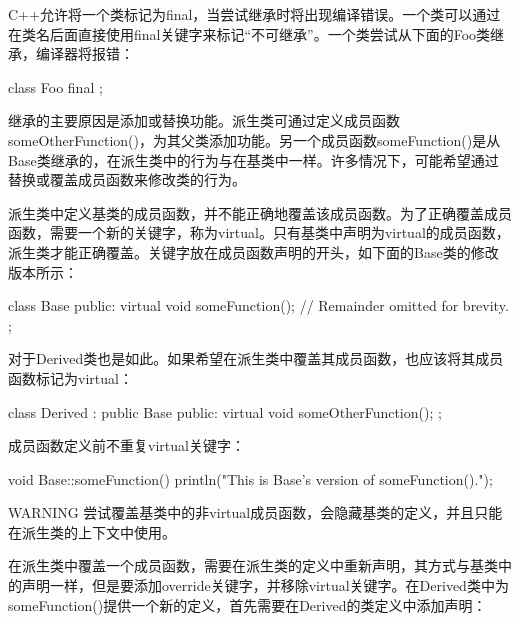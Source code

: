 
C++允许将一个类标记为final，当尝试继承时将出现编译错误。一个类可以通过在类名后面直接使用final关键字来标记“不可继承”。一个类尝试从下面的Foo类继承，编译器将报错：

\begin{cpp}
class Foo final { };
\end{cpp}


继承的主要原因是添加或替换功能。派生类可通过定义成员函数someOtherFunction()，为其父类添加功能。另一个成员函数someFunction()是从Base类继承的，在派生类中的行为与在基类中一样。许多情况下，可能希望通过替换或覆盖成员函数来修改类的行为。


派生类中定义基类的成员函数，并不能正确地覆盖该成员函数。为了正确覆盖成员函数，需要一个新的关键字，称为virtual。只有基类中声明为virtual的成员函数，派生类才能正确覆盖。关键字放在成员函数声明的开头，如下面的Base类的修改版本所示：

\begin{cpp}
class Base
{
    public:
        virtual void someFunction();
        // Remainder omitted for brevity.
};
\end{cpp}

对于Derived类也是如此。如果希望在派生类中覆盖其成员函数，也应该将其成员函数标记为virtual：

\begin{cpp}
class Derived : public Base
{
    public:
        virtual void someOtherFunction();
};
\end{cpp}

成员函数定义前不重复virtual关键字：

\begin{cpp}
void Base::someFunction()
{
    println("This is Base's version of someFunction().");
}
\end{cpp}

\begin{myWarning}{WARNING}
尝试覆盖基类中的非virtual成员函数，会隐藏基类的定义，并且只能在派生类的上下文中使用。
\end{myWarning}


在派生类中覆盖一个成员函数，需要在派生类的定义中重新声明，其方式与基类中的声明一样，但是要添加override关键字，并移除virtual关键字。在Derived类中为someFunction()提供一个新的定义，首先需要在Derived的类定义中添加声明：

